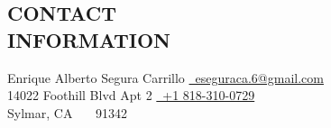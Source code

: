 \documentclass[margin,line]{res}
\begin{document}
\nocite{*}


\begin{resume}

\section{ CONTACT \\ INFORMATION}

Enrique Alberto Segura Carrillo                \hfill \href{mailto:eseguraca.6@gmail.com}{~eseguraca.6@gmail.com}
\vspace{0mm}\\\vspace{0mm}%
14022 Foothill Blvd Apt 2  \hfill \href{tel:8183100729}{~+1 818-310-0729}%
\vspace{0mm}\\\vspace{0mm}%
Sylmar, CA \ \ \ 91342\hfill %



%


\end{resume}
\end{document}
